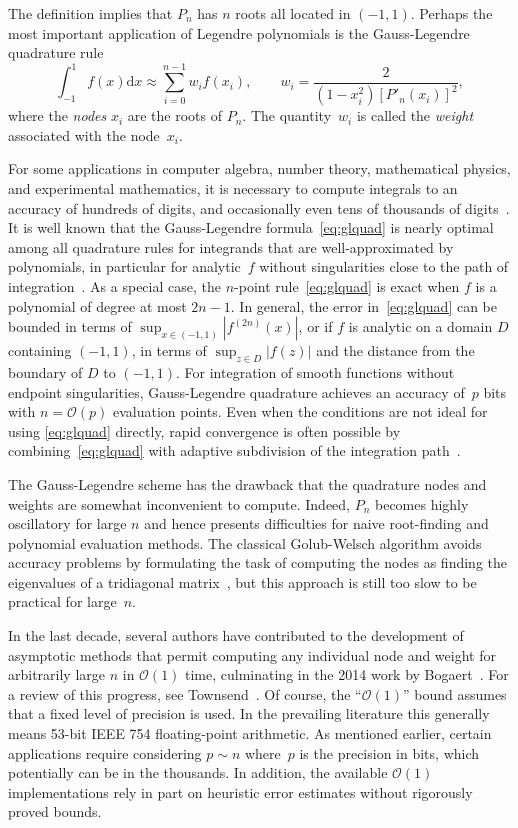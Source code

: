 \documentclass[nohypdvips,review]{siamart0216}
\newcommand{\dx}{\mathrm d x}
\newcommand{\OO}{\mathcal{O}}
\begin{document}
The definition implies that $P_n$ has $n$ roots all located in $(-1,1)$.
Perhaps the most important application of Legendre polynomials
is the Gauss-Legendre quadrature rule
\begin{equation}
\int_{-1}^{1} f(x) \dx \approx \sum_{i=0}^{n-1} w_i f(x_i), \qquad
w_i = \frac{2}{(1-x_i^2) [P'_n(x_i)]^2},
\label{eq:glquad}
\end{equation}
where the \emph{nodes} $x_i$ are the roots of $P_n$.
The quantity~$w_i$ is called the \emph{weight} associated
with the node~$x_i$.

For some applications in computer algebra, number theory,
mathematical physics, and experimental mathematics,
it is necessary to compute integrals to an accuracy of
hundreds of digits, and occasionally even tens of
thousands of digits~\cite{bailey2011high}.
It is well known that the Gauss-Legendre formula~\cref{eq:glquad} is nearly
optimal among all quadrature rules for integrands that are
well-approximated by polynomials, in particular for
analytic~$f$ without singularities close to
the path of integration~\cite{kowalski1985gauss,trefethen2008gauss}.
As a special case, the $n$-point rule~\cref{eq:glquad} is exact
when $f$ is a polynomial of degree at most $2n-1$.
In general, the error in~\cref{eq:glquad} can be bounded in terms of
$\sup_{x \in (-1,1)} |f^{(2n)}(x)|$, or if $f$ is analytic on a domain $D$
containing $(-1,1)$, in terms of $\sup_{z \in D} |f(z)|$
and the distance from the boundary of $D$ to $(-1,1)$.
For integration of smooth functions without endpoint singularities,
Gauss-Legendre quadrature achieves an accuracy of~$p$ bits with $n = \OO(p)$
evaluation points.
Even when the conditions are not ideal for using \cref{eq:glquad} directly,
rapid convergence is often possible
by combining~\cref{eq:glquad}
with adaptive subdivision of the integration path~\cite{petras2002self}.

The Gauss-Legendre scheme has the drawback
that the quadrature nodes and weights are
somewhat inconvenient to compute.
Indeed, $P_n$ becomes highly oscillatory for
large $n$ and hence presents difficulties
for naive root-finding and polynomial evaluation methods.
The classical Golub-Welsch algorithm avoids accuracy problems
by formulating the task of computing the nodes as
finding the eigenvalues of a tridiagonal matrix~\cite{golub1969calculation},
but this approach is still too slow to be practical for large~$n$.

In the last decade, several authors have contributed to
the development of asymptotic methods
that permit computing any individual node and weight for arbitrarily large $n$
in $\OO(1)$ time, culminating in the 2014 work by
Bogaert~\cite{Bogaert2012,hale2013fast,bogaert2014iteration}.
For a review of this progress, see Townsend~\cite{townsend2015race}.
Of course, the ``$\OO(1)$'' bound assumes that a fixed
level of precision is used. In the prevailing literature
this generally means 53-bit IEEE 754 floating-point arithmetic.
As mentioned earlier, certain applications require
considering $p \sim n$ where~$p$ is the precision in bits,
which potentially can be in the thousands.
In addition, the available $\OO(1)$ implementations rely in part
on heuristic error estimates without rigorously proved bounds.
\end{document}
